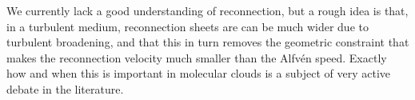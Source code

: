 We currently lack a good understanding of reconnection, but a rough idea is that, in a turbulent medium, reconnection sheets are can be much wider due to turbulent broadening, and that this in turn removes the geometric constraint that makes the reconnection velocity much smaller than the Alfv\'{e}n speed. Exactly how and when this is important in molecular clouds is a subject of very active debate in the literature.
